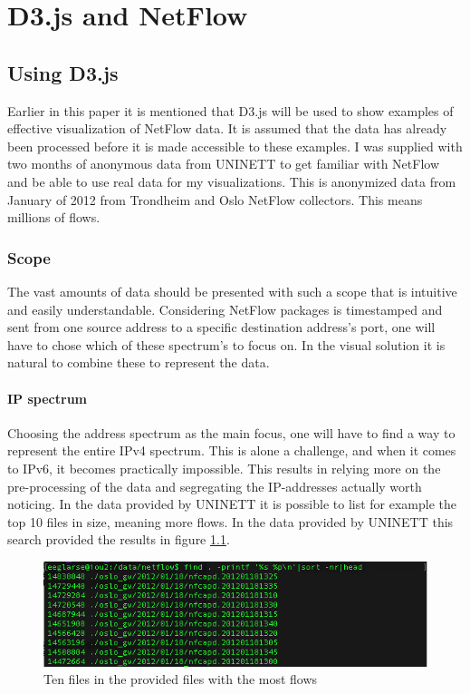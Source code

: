 \chapter{D3.js and NetFlow}
\label{chp:d3andnetflow} 
\section{Using D3.js}
Earlier in this paper it is mentioned that D3.js will be used to show examples of effective visualization of NetFlow data. It is assumed that the data has already been processed before it is made accessible to these examples. I was supplied with two months of anonymous data from UNINETT to get familiar with NetFlow and be able to use real data for my visualizations. This is anonymized data from January of 2012 from Trondheim and Oslo NetFlow collectors. This means millions of flows.

\subsection{Scope}
The vast amounts of data should be presented with such a scope that is intuitive and easily understandable. Considering NetFlow packages is timestamped and sent from one source address to a specific destination address's port, one will have to chose which of these spectrum's to focus on. In the visual solution it is natural to combine these to represent the data. 

\subsubsection{IP spectrum}
\label{sec:ip_spectrum}
Choosing the address spectrum as the main focus, one will have to find a way to represent the entire IPv4 spectrum. This is alone a challenge, and when it comes to IPv6, it becomes practically impossible. This results in relying more on the pre-processing of the data and segregating the IP-addresses actually worth noticing. In the data provided by UNINETT it is possible to list for example the top 10 files in size, meaning more flows. 
In the data provided by UNINETT this search provided the results in figure \ref{topten}.

\begin{figure}[h!]
\includegraphics[scale=0.6]{top10}
\caption{Ten files in the provided files with the most flows}
\label{topten}
\end{figure}

